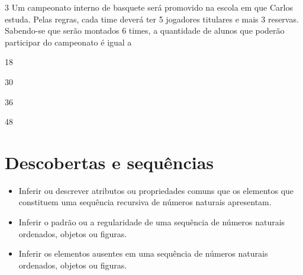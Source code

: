 \num{3} Um campeonato interno de basquete será promovido na escola em que Carlos
estuda. Pelas regras, cada time deverá ter 5 jogadores titulares e mais 3 reservas. Sabendo-se que serão montados 6 times, a quantidade de alunos
que poderão participar do campeonato é igual a

\begin{minipage}{.5\textwidth}
\begin{escolha}
\item
  18
\item
  30
\item
  36
\item
  48
\end{escolha}
\end{minipage}

\chapter{Descobertas e sequências}


\begin{itemize}
\item Inferir ou descrever atributos ou propriedades comuns que os elementos
que constituem uma sequência recursiva de números naturais apresentam.

\item Inferir o padrão ou a regularidade de uma sequência de números
naturais ordenados, objetos ou figuras.

\item Inferir os elementos ausentes em uma sequência de números naturais
ordenados, objetos ou figuras.
\end{itemize}


